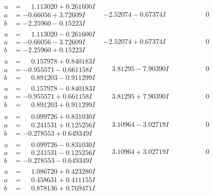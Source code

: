 \documentclass[1p]{elsarticle_modified}
\theoremstyle{definition}
\begin{document}
$$\begin{array}{c|c|c}
\begin{aligned}
u &= \phantom{-}1.113020 + 0.261600 I \\
a &= -0.66056 + 3.72609 I \\
b &= -2.25960 - 0.15223 I\end{aligned}
 & -2.52074 - 0.67374 I & \phantom{-0.000000 } 0 \\ \hline\begin{aligned}
u &= \phantom{-}1.113020 - 0.261600 I \\
a &= -0.66056 - 3.72609 I \\
b &= -2.25960 + 0.15223 I\end{aligned}
 & -2.52074 + 0.67374 I & \phantom{-0.000000 } 0 \\ \hline\begin{aligned}
u &= \phantom{-}0.157978 + 0.840183 I \\
a &= -0.955571 - 0.661158 I \\
b &= \phantom{-}0.891203 - 0.911299 I\end{aligned}
 & \phantom{-}3.81295 - 7.90390 I & \phantom{-0.000000 } 0 \\ \hline\begin{aligned}
u &= \phantom{-}0.157978 - 0.840183 I \\
a &= -0.955571 + 0.661158 I \\
b &= \phantom{-}0.891203 + 0.911299 I\end{aligned}
 & \phantom{-}3.81295 + 7.90390 I & \phantom{-0.000000 } 0 \\ \hline\begin{aligned}
u &= \phantom{-}0.099726 + 0.831030 I \\
a &= \phantom{-}0.241531 + 0.125256 I \\
b &= -0.278553 + 0.649349 I\end{aligned}
 & \phantom{-}3.10964 - 3.02719 I & \phantom{-0.000000 } 0 \\ \hline\begin{aligned}
u &= \phantom{-}0.099726 - 0.831030 I \\
a &= \phantom{-}0.241531 - 0.125256 I \\
b &= -0.278553 - 0.649349 I\end{aligned}
 & \phantom{-}3.10964 + 3.02719 I & \phantom{-0.000000 } 0 \\ \hline\begin{aligned}
u &= \phantom{-}1.086720 + 0.423280 I \\
a &= \phantom{-}0.458631 + 0.411155 I \\
b &= \phantom{-}0.878136 + 0.769471 I\end{aligned}

\end{array}$$
\end{document}
